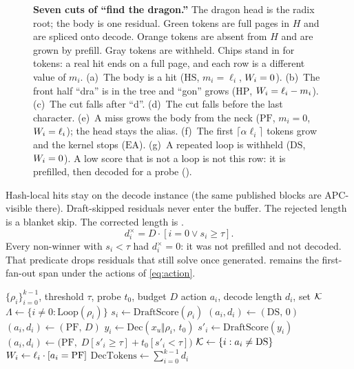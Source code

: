 \begin{figure}[t]
\centering
\resizebox{\textwidth}{!}{}
\caption{\textbf{Seven cuts of ``find the dragon.''}
The dragon head is the radix root; the body is one residual.
Green tokens are full pages in $H$ and are spliced onto decode.
Orange tokens are absent from $H$ and are grown by prefill.
Gray tokens are withheld.
Chips stand in for tokens: a real hit ends on a full page, and each row is a different value of $m_i$.
(a)~The body is a hit ($\mathrm{HS}$, $m_i=\ell_i$, $W_i=0$).
(b)~The front half ``dra'' is in the tree and ``gon'' grows ($\mathrm{HP}$, $W_i=\ell_i-m_i$).
(c)~The cut falls after ``d''.
(d)~The cut falls before the last character.
(e)~A miss grows the body from the neck ($\mathrm{PF}$, $m_i=0$, $W_i=\ell_i$); the head stays the alias.
(f)~The first $\lceil\alpha\ell_i\rceil$ tokens grow and the kernel stops ($\mathrm{EA}$).
(g)~A repeated loop is withheld ($\mathrm{DS}$, $W_i=0$). A low score that is not a loop is not this row: it is prefilled, then decoded for a probe ().}
\label{fig:dragon}
\end{figure}
Hash-local hits stay on the decode instance (the same published blocks are APC-visible there).
Draft-skipped residuals never enter the buffer.
The rejected length is a blanket skip. The corrected length is .
\begin{equation}
\label{eq:drej}
d_i^{\times}=D\cdot[i=0\lor s_i\ge\tau].
\end{equation}
Every non-winner with $s_i<\tau$ had $d_i^{\times}=0$: it was not prefilled and not decoded.
That predicate drops residuals that still solve once generated.
 remains the first-fan-out span under the actions of \eqref{eq:action}.

\begin{algorithm}[t]
\caption{Corrected admission, replacing \eqref{eq:drej}.
$\Lambda$ is the repeated-loop set.
$y_i$ is a probe of $t_0$ tokens and $s'_i$ is its draft score.
Iverson brackets select the decode length.
Only $\Lambda$ keeps the old skip.}
\label{alg:app}
\small
\begin{algorithmic}[1]
\REQUIRE $\{\rho_i\}_{i=0}^{k-1}$, threshold $\tau$, probe $t_0$, budget $D$
\ENSURE action $a_i$, decode length $d_i$, set $\mathcal{K}$
\STATE $\Lambda\leftarrow\{i\neq 0:\mathrm{Loop}(\rho_i)\}$
  \STATE $s_i\leftarrow\mathrm{DraftScore}(\rho_i)$
    \STATE $(a_i,d_i)\leftarrow(\mathrm{DS},\,0)$ 
    \STATE $(a_i,d_i)\leftarrow(\mathrm{PF},\,D)$
  \ELSE
    \STATE $y_i\leftarrow\mathrm{Dec}(x_u\Vert\rho_i,\,t_0)$
    \STATE $s'_i\leftarrow\mathrm{DraftScore}(y_i)$
    \STATE $(a_i,d_i)\leftarrow\big(\mathrm{PF},\; D[s'_i\ge\tau]+t_0[s'_i<\tau]\big)$
  \ENDIF
\ENDFOR
\STATE $\mathcal{K}\leftarrow\{i:a_i\neq\mathrm{DS}\}$
\STATE $W_i\leftarrow\ell_i\cdot[a_i=\mathrm{PF}]$
\STATE $\mathrm{DecTokens}\leftarrow\sum_{i=0}^{k-1} d_i$
\end{algorithmic}
\end{algorithm}


